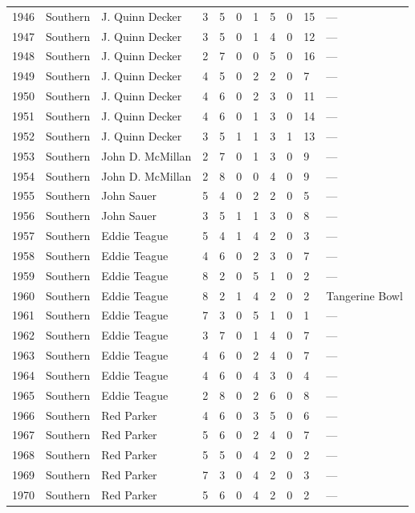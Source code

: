 \documentclass{article}
\begin{document}
\begin{tabular}{lllllllllll}
1946 & Southern & J. Quinn Decker & 3 & 5 & 0 & 1 & 5 & 0 & 15 & — \\
1947 & Southern & J. Quinn Decker & 3 & 5 & 0 & 1 & 4 & 0 & 12 & — \\
1948 & Southern & J. Quinn Decker & 2 & 7 & 0 & 0 & 5 & 0 & 16 & — \\
1949 & Southern & J. Quinn Decker & 4 & 5 & 0 & 2 & 2 & 0 & 7 & — \\
1950 & Southern & J. Quinn Decker & 4 & 6 & 0 & 2 & 3 & 0 & 11 & — \\
1951 & Southern & J. Quinn Decker & 4 & 6 & 0 & 1 & 3 & 0 & 14 & — \\
1952 & Southern & J. Quinn Decker & 3 & 5 & 1 & 1 & 3 & 1 & 13 & — \\
1953 & Southern & John D. McMillan & 2 & 7 & 0 & 1 & 3 & 0 & 9 & — \\
1954 & Southern & John D. McMillan & 2 & 8 & 0 & 0 & 4 & 0 & 9 & — \\
1955 & Southern & John Sauer & 5 & 4 & 0 & 2 & 2 & 0 & 5 & — \\
1956 & Southern & John Sauer & 3 & 5 & 1 & 1 & 3 & 0 & 8 & — \\
1957 & Southern & Eddie Teague & 5 & 4 & 1 & 4 & 2 & 0 & 3 & — \\
1958 & Southern & Eddie Teague & 4 & 6 & 0 & 2 & 3 & 0 & 7 & — \\
1959 & Southern & Eddie Teague & 8 & 2 & 0 & 5 & 1 & 0 & 2 & — \\
1960 & Southern & Eddie Teague & 8 & 2 & 1 & 4 & 2 & 0 & 2 & Tangerine Bowl \\
1961 & Southern & Eddie Teague & 7 & 3 & 0 & 5 & 1 & 0 & 1 & — \\
1962 & Southern & Eddie Teague & 3 & 7 & 0 & 1 & 4 & 0 & 7 & — \\
1963 & Southern & Eddie Teague & 4 & 6 & 0 & 2 & 4 & 0 & 7 & — \\
1964 & Southern & Eddie Teague & 4 & 6 & 0 & 4 & 3 & 0 & 4 & — \\
1965 & Southern & Eddie Teague & 2 & 8 & 0 & 2 & 6 & 0 & 8 & — \\
1966 & Southern & Red Parker & 4 & 6 & 0 & 3 & 5 & 0 & 6 & — \\
1967 & Southern & Red Parker & 5 & 6 & 0 & 2 & 4 & 0 & 7 & — \\
1968 & Southern & Red Parker & 5 & 5 & 0 & 4 & 2 & 0 & 2 & — \\
1969 & Southern & Red Parker & 7 & 3 & 0 & 4 & 2 & 0 & 3 & — \\
1970 & Southern & Red Parker & 5 & 6 & 0 & 4 & 2 & 0 & 2 & — \\

\end{tabular}
\end{document}
